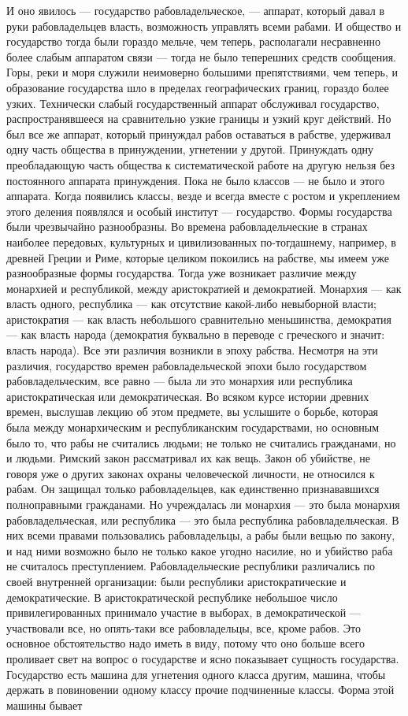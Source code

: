 \documentclass[12pt]{article}
\newcommand{\parnum}{(\arabic{parcount})}
\newcounter{parcount}
\newenvironment{parnumbers}{%
  \par%
  \everypar{\noindent \stepcounter{parcount}\marginpar[]{\parnum}}%
}{}
\begin{document}
\begin{parnumbers}
И оно явилось — государство рабовладельческое, — аппарат, который давал в руки рабовладельцев власть, возможность управлять всеми рабами. И общество и государство тогда были гораздо мельче, чем теперь, располагали несравненно более слабым аппаратом связи — тогда не было теперешних средств сообщения. Горы, реки и моря служили неимоверно большими препятствиями, чем теперь, и образование государства шло в пределах географических границ, гораздо более узких. Технически слабый государственный аппарат обслуживал государство, распространявшееся на сравнительно узкие границы и узкий круг действий. Но был все же аппарат, который принуждал рабов оставаться в рабстве, удерживал одну часть общества в принуждении, угнетении у другой. Принуждать одну преобладающую часть общества к систематической работе на другую нельзя без постоянного аппарата принуждения. Пока не было классов — не было и этого аппарата. Когда появились классы, везде и всегда вместе с ростом и укреплением этого деления появлялся и особый институт — государство. Формы государства были чрезвычайно разнообразны. Во времена рабовладельческие в странах наиболее передовых, культурных и цивилизованных по-тогдашнему, например, в древней Греции и Риме, которые целиком покоились на рабстве, мы имеем уже разнообразные формы государства. Тогда уже возникает различие между монархией и республикой, между аристократией и демократией. Монархия — как власть одного, республика — как отсутствие какой-либо невыборной власти; аристократия — как власть небольшого сравнительно меньшинства, демократия — как власть народа (демократия буквально в переводе с греческого и значит: власть народа). Все эти различия возникли в эпоху рабства. Несмотря на эти различия, государство времен рабовладельческой эпохи было государством рабовладельческим, все равно — была ли это монархия или республика аристократическая или демократическая. Во всяком курсе истории древних времен, выслушав лекцию об этом предмете, вы услышите о борьбе, которая была между монархическим и республиканским государствами, но основным было то, что рабы не считались людьми; не только не считались гражданами, но и людьми. Римский закон рассматривал их как вещь. Закон об убийстве, не говоря уже о других законах охраны человеческой личности, не относился к рабам. Он защищал только рабовладельцев, как единственно признававшихся полноправными гражданами. Но учреждалась ли монархия — это была монархия рабовладельческая, или республика — это была республика рабовладельческая. В них всеми правами пользовались рабовладельцы, а рабы были вещью по закону, и над ними возможно было не только какое угодно насилие, но и убийство раба не считалось преступлением. Рабовладельческие республики различались по своей внутренней организации: были республики аристократические и демократические. В аристократической республике небольшое число привилегированных принимало участие в выборах, в демократической — участвовали все, но опять-таки все рабовладельцы, все, кроме рабов. Это основное обстоятельство надо иметь в виду, потому что оно больше всего проливает свет на вопрос о государстве и ясно показывает сущность государства. Государство есть машина для угнетения одного класса другим, машина, чтобы держать в повиновении одному классу прочие подчиненные классы. Форма этой машины бывает 
\end{parnumbers}
\end{document}
